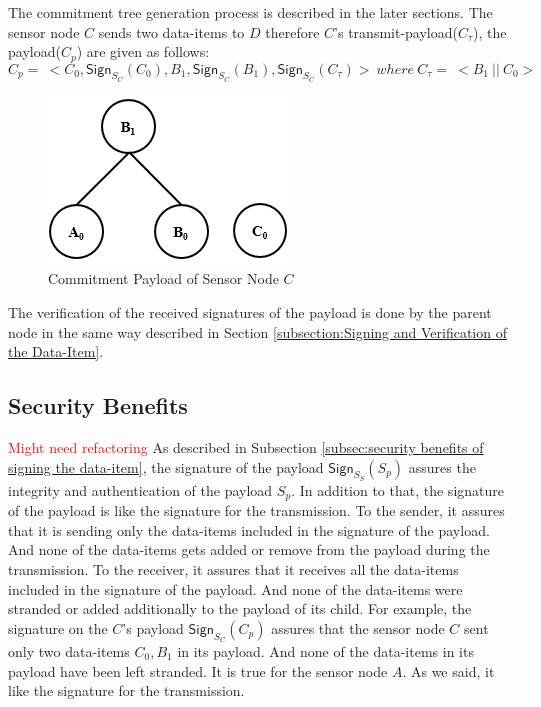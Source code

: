 	The commitment tree generation process is described in the later sections. 
	The sensor node $C$ sends two data-items to $D$ therefore $C$'s transmit-payload($C_{\tau}$), the payload($C_{p}$) are given as follows:
	\begin{equation}
		 	C_{p} =\ <C_{0}, \textsf{Sign}_{S_{C}}(C_{0}), B_{1}, \textsf{Sign}_{S_{C}}(B_{1}), \textsf{Sign}_{S_{C}}(C_{\tau}) >\ where\ C_{\tau} =\ <B_{1}\ ||\ C_{0}>
	\end{equation}
	\begin{figure}[h!]
		\centering
		\includegraphics[scale = 1]{images/commitment-payload-of-C.png}
		\caption{Commitment Payload of Sensor Node $C$}
		\label{fig:Commitment payload of C}
	\end{figure}
	The verification of the received signatures of the payload is done by the parent node in the same way described in Section \ref{subsection:Signing and Verification of the Data-Item}.

	\subsection{Security Benefits}
		\textcolor{red}{Might need refactoring}
		As described in Subsection \ref{subsec:security benefits of signing the data-item}, the signature of the payload $\textsf{Sign}_{S_{S}}(S_{p})$ assures the integrity and authentication of the payload $S_{p}$.
		In addition to that, the signature of the payload is like the signature for the transmission.
		To the sender, it assures that it is sending only the data-items included in the signature of the payload.
		And none of the data-items gets added or remove from the payload during the transmission. 
		To the receiver, it assures that it receives all the data-items included in the signature of the payload. 
		And none of the data-items were stranded or added additionally to the payload of its child.
		For example, the signature on the $C$'s payload $\textsf{Sign}_{S_{C}}(C_{p})$ assures that the sensor node $C$ sent only two data-items $C_{0},B_{1}$ in its payload.
		And none of the data-items in its payload have been left stranded.
		It is true for the sensor node $A$.
		As we said, it like the signature for the transmission.


